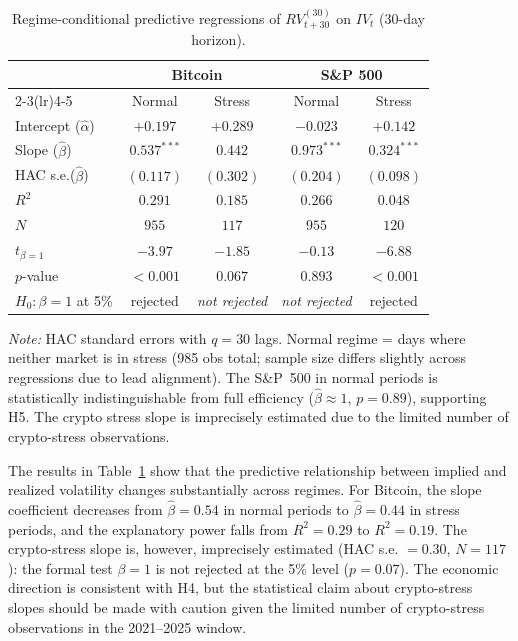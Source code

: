 \documentclass[11pt,a4paper,openany]{report}
\begin{document}
\begin{table}[H]
\centering
\caption{Regime-conditional predictive regressions of $RV^{(30)}_{t+30}$ on $IV_t$ (30-day horizon).}
\label{tab:reg_regime}
\begin{tabular}{lcccc}
\toprule
& \multicolumn{2}{c}{Bitcoin} & \multicolumn{2}{c}{S\&P 500} \\
\cmidrule(lr){2-3}\cmidrule(lr){4-5}
& Normal & Stress & Normal & Stress \\
\midrule
Intercept ($\hat{\alpha}$) & $+0.197$ & $+0.289$ & $-0.023$ & $+0.142$ \\
Slope ($\hat{\beta}$)      & $0.537^{***}$ & $0.442$ & $0.973^{***}$ & $0.324^{***}$ \\
HAC s.e.($\hat{\beta}$)    & $(0.117)$ & $(0.302)$ & $(0.204)$ & $(0.098)$ \\
$R^{2}$                    & $0.291$ & $0.185$ & $0.266$ & $0.048$ \\
$N$                        & $955$ & $117$ & $955$ & $120$ \\
\midrule
$t_{\beta=1}$              & $-3.97$ & $-1.85$ & $-0.13$ & $-6.88$ \\
\quad $p$-value            & $<0.001$ & $0.067$ & $0.893$ & $<0.001$ \\
\quad $H_0: \beta=1$ at 5\% & rejected & \emph{not rejected} & \emph{not rejected} & rejected \\
\bottomrule
\end{tabular}
\begin{flushleft}\small
\textit{Note:} HAC standard errors with $q=30$ lags. Normal regime = days where neither market is in stress (985 obs total; sample size differs slightly across regressions due to lead alignment). The S\&P~500 in normal periods is statistically indistinguishable from full efficiency ($\hat{\beta}\approx1$, $p=0.89$), supporting H5. The crypto stress slope is imprecisely estimated due to the limited number of crypto-stress observations.
\end{flushleft}
\end{table}

The results in Table~\ref{tab:reg_regime} show that the predictive
relationship between implied and realized volatility changes
substantially across regimes. For Bitcoin, the slope coefficient
decreases from $\hat{\beta}=0.54$ in normal periods to
$\hat{\beta}=0.44$ in stress periods, and the explanatory power falls
from $R^2 = 0.29$ to $R^2 = 0.19$. The crypto-stress slope is, however,
imprecisely estimated (HAC s.e. $=0.30$, $N=117$): the formal test
$\beta=1$ is not rejected at the 5\% level ($p=0.07$). The economic
direction is consistent with H4, but the statistical claim about
crypto-stress slopes should be made with caution given the limited
number of crypto-stress observations in the 2021--2025 window.
\end{document}

